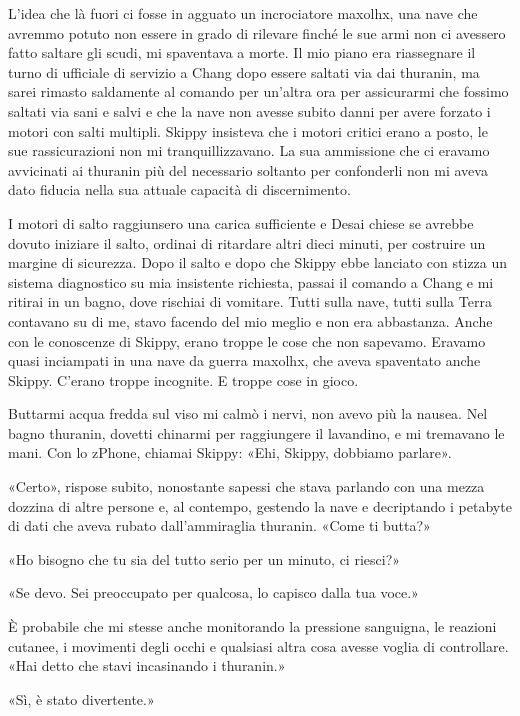 L'idea che là fuori ci fosse in agguato un incrociatore maxolhx, una
nave che avremmo potuto non essere in grado di rilevare finché le sue
armi non ci avessero fatto saltare gli scudi, mi spaventava a morte. Il
mio piano era riassegnare il turno di ufficiale di servizio a Chang dopo
essere saltati via dai thuranin, ma sarei rimasto saldamente al comando
per un'altra ora per assicurarmi che fossimo saltati via sani e salvi e
che la nave non avesse subito danni per avere forzato i motori con salti
multipli. Skippy insisteva che i motori critici erano a posto, le sue
rassicurazioni non mi tranquillizzavano. La sua ammissione che ci
eravamo avvicinati ai thuranin più del necessario soltanto per
confonderli non mi aveva dato fiducia nella sua attuale capacità di
discernimento.

I motori di salto raggiunsero una carica sufficiente e Desai chiese se
avrebbe dovuto iniziare il salto, ordinai di ritardare altri dieci
minuti, per costruire un margine di sicurezza. Dopo il salto e dopo che
Skippy ebbe lanciato con stizza un sistema diagnostico su mia insistente
richiesta, passai il comando a Chang e mi ritirai in un bagno, dove
rischiai di vomitare. Tutti sulla nave, tutti sulla Terra contavano su
di me, stavo facendo del mio meglio e non era abbastanza. Anche con le
conoscenze di Skippy, erano troppe le cose che non sapevamo. Eravamo
quasi inciampati in una nave da guerra maxolhx, che aveva spaventato
anche Skippy. C'erano troppe incognite. E troppe cose in gioco.

Buttarmi acqua fredda sul viso mi calmò i nervi, non avevo più la
nausea. Nel bagno thuranin, dovetti chinarmi per raggiungere il
lavandino, e mi tremavano le mani. Con lo zPhone, chiamai Skippy: «Ehi,
Skippy, dobbiamo parlare».

«Certo», rispose subito, nonostante sapessi che stava parlando con una
mezza dozzina di altre persone e, al contempo, gestendo la nave e
decriptando i petabyte di dati che aveva rubato dall'ammiraglia
thuranin. «Come ti butta?»

«Ho bisogno che tu sia del tutto serio per un minuto, ci riesci?»

«Se devo. Sei preoccupato per qualcosa, lo capisco dalla tua voce.»

È probabile che mi stesse anche monitorando la pressione sanguigna, le
reazioni cutanee, i movimenti degli occhi e qualsiasi altra cosa avesse
voglia di controllare. «Hai detto che stavi incasinando i thuranin.»

«Sì, è stato divertente.»


